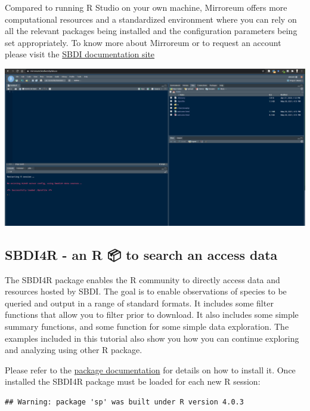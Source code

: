 \documentclass[
  10pt,
]{article}
\begin{document}
Compared to running R Studio on your own machine, Mirroreum offers more computational resources and a standardized environment where you can rely on all the relevant packages being installed and the configuration parameters being set appropriately. To know more about Mirroreum or to request an account please visit the \href{https://docs.biodiversitydata.se/analyse-data/mirroreum/}{SBDI documentation site}

\href{https://mirroreum.biodiversitydata.se/auth-sign-in}{\includegraphics{images/Mirroreum.png}}

\hypertarget{sbdi4r---an-r-to-search-an-access-data}{%
\subsection*{SBDI4R - an R 📦 to search an access data}\label{sbdi4r---an-r-to-search-an-access-data}}

The SBDI4R package enables the R community to directly access data and resources hosted by SBDI. The goal is to enable observations of species to be queried and output in a range of standard formats. It includes some filter functions that allow you to filter prior to download. It also includes some simple summary functions, and some function for some simple data exploration. The examples included in this tutorial also show you how you can continue exploring and analyzing using other R package.

Please refer to the \href{https://biodiversitydata-se.github.io/SBDI4R}{package documentation} for details on how to install it. Once installed the SBDI4R package must be loaded for each new R session:

\begin{verbatim}
## Warning: package 'sp' was built under R version 4.0.3
\end{verbatim}
\end{document}
